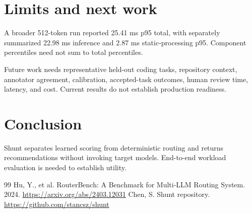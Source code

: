 \documentclass[11pt]{article}
\begin{document}
\section{Limits and next work}
A broader 512-token run reported 25.41 ms p95 total, with separately summarized 22.98 ms inference and 2.87 ms static-processing p95. Component percentiles need not sum to total percentiles.\par
Future work needs representative held-out coding tasks, repository context, annotator agreement, calibration, accepted-task outcomes, human review time, latency, and cost. Current results do not establish production readiness.\par
\section{Conclusion}
Shunt separates learned scoring from deterministic routing and returns recommendations without invoking target models. End-to-end workload evaluation is needed to establish utility.\par
\begin{thebibliography}{99}
 Hu, Y., et al. RouterBench: A Benchmark for Multi-LLM Routing System. 2024. \url{https://arxiv.org/abs/2403.12031}
 Chen, S. Shunt repository. \url{https://github.com/stancsz/shunt}
\end{thebibliography}
\end{document}
